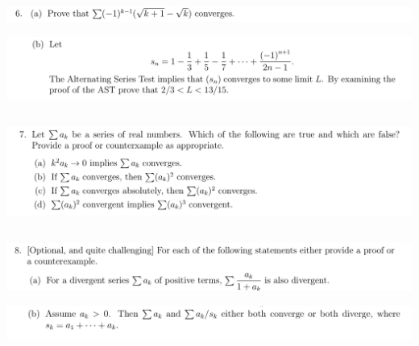 \documentclass[12pt]{article}
\begin{document}
\newpage
\subsection{}
\begin{mdframed}
\includegraphics[width=400pt]{img/analysis--oxford-M2-I-5-6-a.png}
\end{mdframed}

\begin{mdframed}
\includegraphics[width=400pt]{img/analysis--oxford-M2-I-5-6-b.png}
\end{mdframed}

\newpage
\subsection{}
\begin{mdframed}
\includegraphics[width=400pt]{img/analysis--oxford-M2-I-5-7.png}
\end{mdframed}

\newpage
\subsection{}
\begin{mdframed}
\includegraphics[width=400pt]{img/analysis--oxford-M2-I-5-8-a.png}
\end{mdframed}

\begin{mdframed}
\includegraphics[width=400pt]{img/analysis--oxford-M2-I-5-8-b.png}
\end{mdframed}
\end{document}
